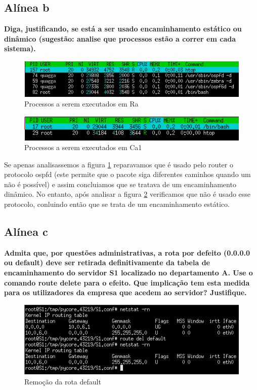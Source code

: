 \documentclass[a4paper]{report}
\begin{document}
\subsection{Alínea b}
\textbf{Diga, justificando, se está a ser usado encaminhamento estático ou
dinâmico (sugestão: analise que processos estão a correr em cada sistema).}

\begin{figure}[H]
    \centering 
    \includegraphics[width=\textwidth]{images/htop2a.png}
    \caption{Processos a serem executados em Ra}
    \label{fig:htop2a}
\end{figure}

\begin{figure}[H]
    \centering 
    \includegraphics[width=\textwidth]{images/htopca1.png}
    \caption{Processos a serem executados em Ca1}
    \label{fig:htopca1}
\end{figure}
Se apenas analisassemos a figura \ref{fig:htop2a} reparavamos que é usado pelo router
o protocolo ospfd (este permite que o pacote siga diferentes caminhos quando um não é
possível) e assim concluiamos que se tratava de um encaminhamento dinâmico. No entanto,
após analisar a figura \ref{fig:htopca1} verificamos que não é usado esse protocolo,
conluindo então que se trata de um encaminhamento estático.

\subsection{Alínea c}
\textbf{Admita que, por questões administrativas, a rota por defeito (0.0.0.0 ou
default) deve ser retirada definitivamente da tabela de encaminhamento do
servidor S1 localizado no departamento A. Use o comando route delete para o
efeito. Que implicação tem esta medida para os utilizadores da empresa que
acedem ao servidor? Justifique.}

\begin{figure}[H]
    \centering 
    \includegraphics[width=\textwidth]{images/routeDelete.png}
    \caption{Remoção da rota default}
    \label{fig:routeDelete}
\end{figure}
\end{document}
